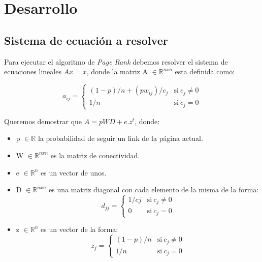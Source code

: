 \section{Desarrollo}

\subsection{Sistema de ecuación a resolver} %

Para ejecutar el algoritmo de \emph{Page Rank} debemos resolver el sistema de ecuaciones lineales $A x = x$, donde la matriz A $\in \mathbb{R}^{nxn}$ esta definida como:

\begin{equation}
    a_{ij} = \left\{
            \begin{array}{ll}
                 (1-p)/n + (pw_{ij})/c_j      & \mathrm{si\ } c_j \neq 0 \\
                 1/n & \mathrm{si\ } c_j = 0
            \end{array}
        \right.
\end{equation}

Queremos demostrar que $A = pWD + e.z^t$, donde:  
\begin{itemize}
	\item p $\in \mathbb{R}$ la probabilidad de seguir un link de la página actual.  
	\item W $\in \mathbb{R}^{nxn}$ es la matriz de conectividad.  
	\item e $\in \mathbb{R}^{n}$ es un vector de unos.
    \item D $\in \mathbb{R}^{nxn}$ es una matriz diagonal con cada elemento de la misma de la forma:     
    \begin{equation}
    	\label{defd}
        d_{jj} = \left\{
                \begin{array}{ll}
                     1/cj & \mathrm{si\ } c_j \neq 0 \\
                     0    & \mathrm{si\ } c_j = 0
                \end{array}
            \right.
    \end{equation}
    \item z $\in \mathbb{R}^{n}$ es un vector de la forma:  
    \begin{equation}
    	\label{defz}
        z_{j} = \left\{
                \begin{array}{ll}
                     (1-p)/n      & \mathrm{si\ } c_j \neq 0 \\
                     1/n & \mathrm{si\ } c_j = 0
                \end{array}
            \right.
    \end{equation}
\end{itemize}

